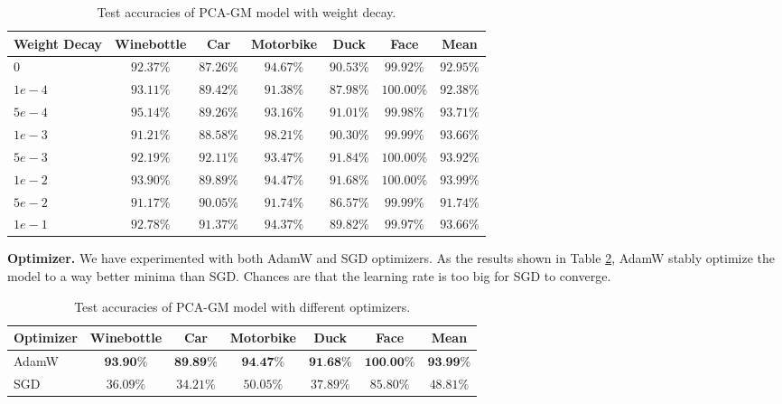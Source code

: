\documentclass[a4paper]{article}
\begin{document}
\begin{table}[htbp]
    \centering
    \begin{tabular}{lcccccc}
        \toprule
        Weight Decay& Winebottle& Car& Motorbike& Duck& Face& Mean\\
        \midrule
        $0$& $92.37\%$& $87.26\%$& $94.67\%$& $90.53\%$& $99.92\%$& $92.95\%$\\
        $1e-4$& $93.11\%$& $89.42\%$& $91.38\%$& $87.98\%$& $\mathbf{100.00\%}$& $92.38\%$\\
        $5e-4$& $\mathbf{95.14\%}$& $89.26\%$& $93.16\%$& $91.01\%$& $99.98\%$& $93.71\%$\\
        $1e-3$& $91.21\%$& $88.58\%$& $\mathbf{98.21\%}$& $90.30\%$& $99.99\%$& $93.66\%$\\
        $5e-3$& $92.19\%$& $\mathbf{92.11\%}$& $93.47\%$& $\mathbf{91.84\%}$& $\mathbf{100.00\%}$& $93.92\%$\\
        $1e-2$& $93.90\%$& $89.89\%$& $94.47\%$& $91.68\%$& $\mathbf{100.00\%}$& $\mathbf{93.99\%}$\\
        $5e-2$& $91.17\%$& $90.05\%$& $91.74\%$& $86.57\%$& $99.99\%$& $91.74\%$\\
        $1e-1$& $92.78\%$& $91.37\%$& $94.37\%$& $89.82\%$& $99.97\%$& $93.66\%$\\
        \bottomrule
        
    \end{tabular}
    \caption{Test accuracies of PCA-GM model with weight decay.}
    \label{tab:weightdecay}
\end{table}

\textbf{Optimizer.}
We have experimented with both AdamW and SGD optimizers. As the results shown in Table \ref{tab:optimizer}, AdamW stably optimize the model to a way better minima than SGD. Chances are that the learning rate is too big for SGD to converge.

\begin{table}[htbp]
    \centering
    \begin{tabular}{lcccccc}
        \toprule
        Optimizer& Winebottle& Car& Motorbike& Duck& Face& Mean\\
        \midrule
        AdamW& $\textbf{93.90\%}$& $\textbf{89.89\%}$& $\textbf{94.47\%}$& $\textbf{91.68\%}$& $\textbf{100.00\%}$& $\textbf{93.99\%}$\\
        SGD& $36.09\%$& $34.21\%$& $50.05\%$& $37.89\%$& $85.80\%$& $48.81\%$\\
        \bottomrule
        
    \end{tabular}
    \caption{Test accuracies of PCA-GM model with different optimizers.}
    \label{tab:optimizer}
\end{table}
\end{document}
